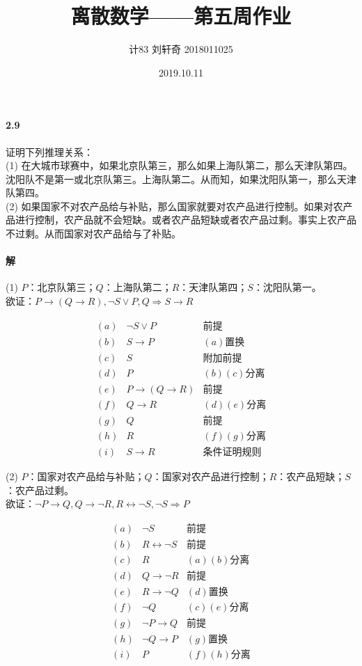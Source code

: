 \documentclass[hyperref, UTF8]{ctexart}
\title{离散数学——第五周作业}
\author{计83  刘轩奇  2018011025}
\date{2019.10.11}
\begin{document}
\maketitle

\paragraph{2.9}\label{2.9}
证明下列推理关系：\\

(1) 在大城市球赛中，如果北京队第三，那么如果上海队第二，那么天津队第四。沈阳队不是第一或北京队第三。上海队第二。从而知，如果沈阳队第一，那么天津队第四。\\

(2) 如果国家不对农产品给与补贴，那么国家就要对农产品进行控制。如果对农产品进行控制，农产品就不会短缺。或者农产品短缺或者农产品过剩。事实上农产品不过剩。从而国家对农产品给与了补贴。

\paragraph{解}

(1) $P$：北京队第三；$Q$：上海队第二；$R$：天津队第四；$S$：沈阳队第一。\\

\quad 欲证：$ P \rightarrow (Q \rightarrow R), \lnot S \lor P, Q \Rightarrow S \rightarrow R $ 

\begin{align*}
(a) & \lnot S \lor P & \text{前提} \\
(b) & S \to P & (a)\text{置换} \\
(c) & S & \text{附加前提} \\
(d) & P & (b)(c)\text{分离} \\
(e) & P \to (Q \to R) & \text{前提} \\
(f) & Q \to R & (d)(e)\text{分离} \\
(g) & Q & \text{前提} \\
(h) & R & (f)(g)\text{分离} \\
(i) & S \rightarrow R & \text{条件证明规则}
\end{align*}

(2) $P$：国家对农产品给与补贴；$Q$：国家对农产品进行控制；$R$：农产品短缺；$S$：农产品过剩。\\

\quad 欲证：$  \lnot P \rightarrow Q, Q \rightarrow \lnot R, R \leftrightarrow \lnot S, \lnot S \Rightarrow P $ 

\begin{align*}
(a) & \lnot S & \text{前提} \\
(b) & R \leftrightarrow \lnot S & \text{前提} \\
(c) & R & (a)(b)\text{分离} \\
(d) & Q \to \lnot R & \text{前提} \\
(e) & R \to \lnot Q & (d)\text{置换} \\
(f) & \lnot Q & (c)(e)\text{分离} \\
(g) & \lnot P \to Q & \text{前提} \\
(h) & \lnot Q \to P & (g)\text{置换} \\
(i) & P & (f)(h)\text{分离}
\end{align*}
\end{document}
